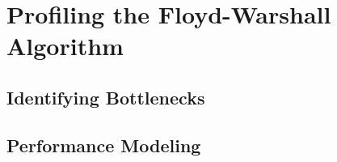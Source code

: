
\section{Profiling the Floyd-Warshall Algorithm}
\label{sec-profile}

\subsection{Identifying Bottlenecks}
\label{sec-profile-bottlenecks}

\subsection{Performance Modeling}
\label{sec-profile-modeling}
